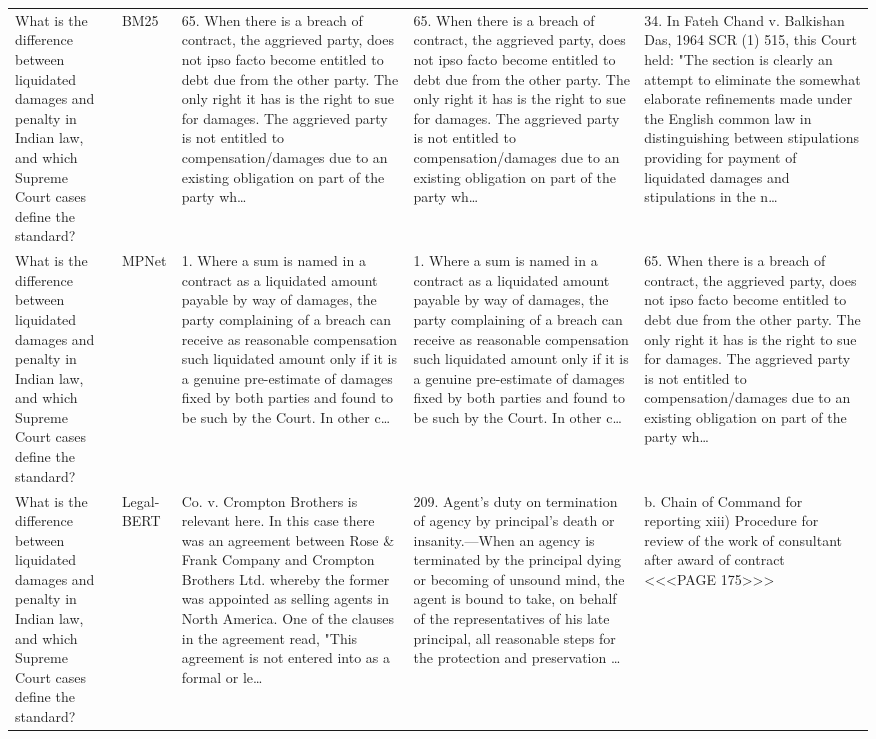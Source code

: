 \documentclass[11pt]{article}
\begin{document}
\begin{xltabular}{\textwidth}{|p{3.2cm}|p{2.2cm}|Y|Y|Y|}
        What is the difference between liquidated damages and penalty in Indian law, and which Supreme Court cases define the standard? & BM25 & 65. When there is a breach of contract, the aggrieved party, does not ipso facto become entitled to debt due from the other party. The only right it has is the right to sue for damages. The aggrieved party is not entitled to compensation/damages due to an existing obligation on part of the party wh… & 65. When there is a breach of contract, the aggrieved party, does not ipso facto become entitled to debt due from the other party. The only right it has is the right to sue for damages. The aggrieved party is not entitled to compensation/damages due to an existing obligation on part of the party wh… & 34. In Fateh Chand v. Balkishan Das, 1964 SCR (1) 515, this  Court held:  "The section is clearly an attempt to eliminate the somewhat elaborate refinements made under the English common law in distinguishing between stipulations providing for payment of liquidated damages and stipulations in the n… \\ 
        What is the difference between liquidated damages and penalty in Indian law, and which Supreme Court cases define the standard? & MPNet & 1. Where a sum is named in a contract as a liquidated amount payable by way of damages, the party complaining of a breach can receive as reasonable compensation such liquidated amount only if it is a genuine pre-estimate of damages fixed by both parties and found to be such by the Court. In other c… & 1. Where a sum is named in a contract as a liquidated amount payable by way of damages, the party complaining of a breach can receive as reasonable compensation such liquidated amount only if it is a genuine pre-estimate of damages fixed by both parties and found to be such by the Court. In other c… & 65. When there is a breach of contract, the aggrieved party, does not ipso facto become entitled to debt due from the other party. The only right it has is the right to sue for damages. The aggrieved party is not entitled to compensation/damages due to an existing obligation on part of the party wh… \\ 
        What is the difference between liquidated damages and penalty in Indian law, and which Supreme Court cases define the standard? & Legal-BERT & Co. v. Crompton Brothers is relevant here. In this case there was an agreement between Rose \& Frank Company and Crompton Brothers Ltd. whereby the former was appointed as selling agents in North America. One of the clauses in the agreement read, "This agreement is not entered into as a formal or le… & 209. Agent's duty on termination of agency by principal's death or insanity.—When an agency is terminated by the principal dying or becoming of unsound mind, the agent is bound to take, on behalf of the representatives of his late principal, all reasonable steps for the protection and preservation … & b. Chain of Command for reporting  xiii) Procedure for review of the work of consultant after award of contract  <<<PAGE 175>>> \\ 

\end{xltabular}
\end{document}
